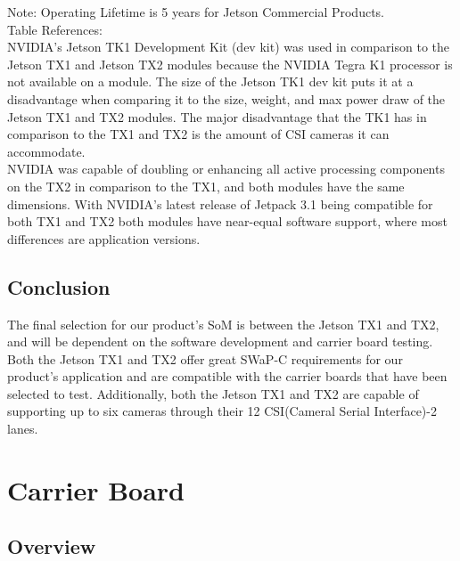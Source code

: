 \documentclass[letterpaper,10pt,serif,draftclsnofoot,onecolumn,compsoc,titlepage]{IEEEtran}
\begin{document}
\newline
\newline
\newline
Note: Operating Lifetime is 5 years for Jetson Commercial Products.\\
Table References: \cite{TK1Wiki, TK1Power, TK1Rev, JetsonFAQ, TegraK1, TK12Comp, JetsonGenius, TX1PS, TX2DS}\\

NVIDIA's Jetson TK1 Development Kit (dev kit) was used in comparison to the Jetson TX1 
and Jetson TX2 modules because the NVIDIA Tegra K1 processor is not available on a 
module. The size of the Jetson TK1 dev kit puts it at a 
disadvantage when comparing it to the size, weight, and max power draw of the Jetson 
TX1 and TX2 modules. The major disadvantage that the TK1 has in comparison to the TX1 
and TX2 is the amount of CSI cameras it can accommodate. \\

NVIDIA was capable of doubling or enhancing all active processing components on the 
TX2 in comparison to the TX1, and both modules have the same dimensions. With NVIDIA's 
latest release of Jetpack 3.1 being compatible for both TX1 and TX2 both modules 
have near-equal software support, where most differences are application 
versions\cite{TX1Wiki, TX2Wiki, JetPackRel}. \\  

\subsection{Conclusion}

The final selection for our product's SoM is between the Jetson TX1 and TX2, and will 
be dependent on the software development and carrier board testing. Both the 
Jetson TX1 and TX2 offer great SWaP-C requirements for our product's application and 
are compatible with the carrier boards that have been selected to test. Additionally, 
both the Jetson TX1 and TX2 are capable of supporting up to six cameras through their 
12 CSI(Cameral Serial Interface)-2 lanes. \\

\section{Carrier Board}

\subsection{Overview}
\end{document}
